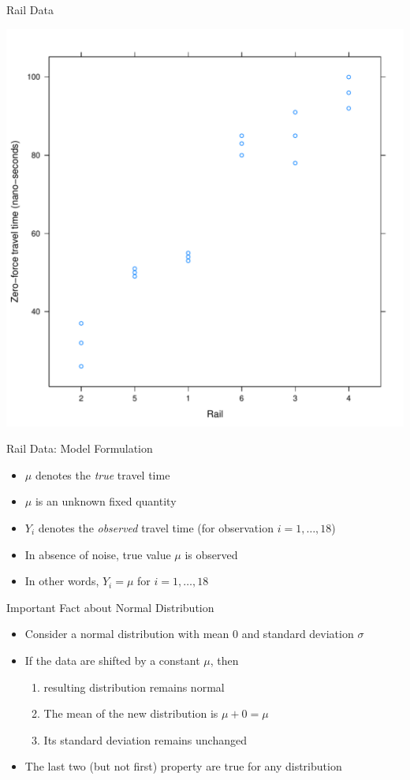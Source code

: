 \documentclass[xcolor=x11names,compress]{beamer}\usepackage[]{graphicx}\usepackage[]{color}
\newenvironment{knitrout}{}{} %
\begin{document}
\begin{frame}{Rail Data}
\begin{knitrout}\tiny
{}\color{fgcolor}

{\centering \includegraphics[width=.6\linewidth]{figure/beamer-railplots-1} 

}



\end{knitrout}

\end{frame}

\begin{frame}{Rail Data: Model Formulation}
  \begin{itemize}
  \item $\mu$ denotes the {\it true} travel time
  \item $\mu$ is an unknown fixed quantity
  \item $Y_i$ denotes the {\it observed} travel time 
        (for observation $i=1,\ldots,18$)
  \item In absence of noise, true value $\mu$
        is observed
  \item In other words, $Y_{i}=\mu$ for $i=1,\ldots,18$
  \end{itemize}
\end{frame}


\begin{frame}{Important Fact about Normal Distribution}
  \begin{itemize}
  \item Consider a normal distribution with mean 0 and standard deviation
        $\sigma$
  \item If the data are shifted by a constant $\mu$, then
    \begin{enumerate}
    \item  resulting
        distribution remains normal
     \item The mean of the new distribution is $\mu+0=\mu$
  \item Its standard deviation remains unchanged
    \end{enumerate}
  \item The last two (but not first) property are true for any distribution
  \end{itemize}
\end{frame}
\end{document}
